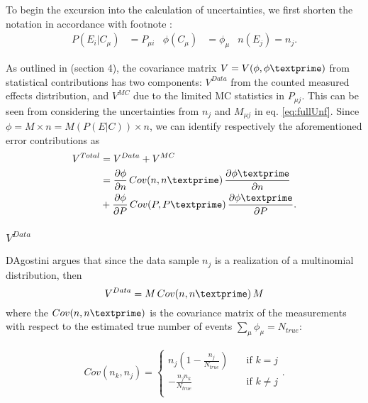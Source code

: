 

To begin the excursion into the calculation of uncertainties, we first shorten the notation in accordance with footnote :
\begin{align*}
	P(E_{i}|C_{\mu}) &= P_{\mu i}
	&
	\phi(C_{\mu}) &= \phi_{\mu}
	&
	n(E_{j}) = n_{j}.
\end{align*}

As outlined in \cite{agostini} (section 4), the covariance matrix $V=V(\phi,\phi\textprime)$ from statistical contributions has two components: $V^{Data}$ from the 
counted measured effects distribution, and $V^{MC}$ due to the limited MC statistics in $P_{\mu j}$.
This can be seen from considering the uncertainties from $n_{j}$ and $M_{\mu j}$ in eq. \ref{eq:fullUnf}.
Since $\phi=M\times n=M(P(E|C))\times n$, we can identify respectively the aforementioned error contributions as
\begin{align*}
  V^{Total} &= V^{Data}+V^{MC} \\
  &= \frac{\partial \phi}{\partial n} \, Cov({n,n\textprime}) \, \frac{\partial \phi\textprime}{\partial n}
  \\
  &
  +\frac{\partial \phi}{\partial P} \, Cov({P,P\textprime}) \, \frac{\partial \phi\textprime}{\partial P}.
\end{align*}

\subsubsection{$V^{Data}$}
D\textquotesingle Agostini argues that since the data sample $n_{j}$ is a realization of a multinomial distribution,
then
\begin{equation} \label{eq:Vn_agos}
V^{Data} = M \, Cov(n,n\textprime) \, M
\end{equation}
where the $Cov(n,n\textprime)$ is the 
covariance matrix of the measurements with respect to the estimated true number of events $\sum_{\mu}{\phi_{\mu}}=N_{true}$:

\begin{equation}
 \begin{split}
Cov(n_{k},n_{j}) = 
  \begin{cases}
    n_{j}(1-\frac{n_{j}}{N_{true}})       & \quad \text{if } k = j \\
    -\frac{n_{j}n_{k}}{N_{true}}  & \quad \text{if } k \ne j \\
  \end{cases}.
 \end{split}
\end{equation}

